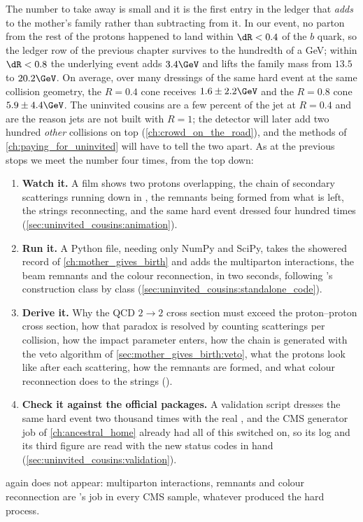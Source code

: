 The number to take away is small and it is the first entry in the ledger
that \emph{adds} to the mother's family rather than subtracting from it. In
our event, no parton from the rest of the protons happened to land within
$\dR<0.4$ of the $b$ quark, so the ledger row of the previous chapter
survives to the hundredth of a GeV; within $\dR<0.8$ the underlying event
adds $3.4\GeV$ and lifts the family mass from $13.5$ to $20.2\GeV$. On
average, over many dressings of the same hard event at the same collision
geometry, the $R=0.4$ cone receives $1.6\pm2.2\GeV$ and the $R=0.8$ cone
$5.9\pm4.4\GeV$. The uninvited cousins are a few percent of the jet at
$R=0.4$ and are the reason jets are not built with $R=1$; the detector will
later add two hundred \emph{other} collisions on top
(\cref{ch:crowd_on_the_road}), and the methods of
\cref{ch:paying_for_uninvited} will have to tell the two apart. As at the
previous stops we meet the number four times, from the top down:
\begin{enumerate}[nosep]
  \item \textbf{Watch it.} A film shows two protons overlapping, the chain
    of secondary scatterings running down in \pt, the remnants being formed
    from what is left, the strings reconnecting, and the same hard event
    dressed four hundred times (\cref{sec:uninvited_cousins:animation}).
  \item \textbf{Run it.} A Python file, needing only NumPy and SciPy, takes
    the showered record of \cref{ch:mother_gives_birth} and adds the
    multiparton interactions, the beam remnants and the colour
    reconnection, in two seconds, following \PYTHIA's construction class by
    class (\cref{sec:uninvited_cousins:standalone_code}).
  \item \textbf{Derive it.} Why the QCD $2\to2$ cross section must exceed
    the proton--proton cross section, how that paradox is resolved by
    counting scatterings per collision, how the impact parameter enters,
    how the chain is generated with the veto algorithm of
    \cref{sec:mother_gives_birth:veto}, what the protons look like after each
    scattering, how the remnants are formed, and what colour reconnection
    does to the strings
    ().
  \item \textbf{Check it against the official packages.} A validation
    script dresses the same hard event two thousand times with the real
    \PYTHIA, and the CMS generator job of \cref{ch:ancestral_home} already
    had all of this switched on, so its log and its third figure are read
    with the new status codes in hand
    (\cref{sec:uninvited_cousins:validation}).
\end{enumerate}
\MG again does not appear: multiparton interactions, remnants and colour
reconnection are \PYTHIA's job in every CMS sample, whatever produced the
hard process.

